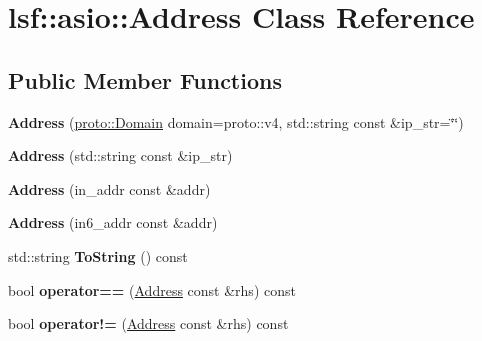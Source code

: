 \hypertarget{classlsf_1_1asio_1_1Address}{
\section{lsf::asio::Address Class Reference}
\label{classlsf_1_1asio_1_1Address}
}
\subsection*{Public Member Functions}
\begin{DoxyCompactItemize}
\item 
\hypertarget{classlsf_1_1asio_1_1Address_ad29b71a6abd25a94f80e0c92bf7bb107}{
{\bfseries Address} (\hyperlink{classlsf_1_1asio_1_1proto_1_1Domain}{proto::Domain} domain=proto::v4, std::string const \&ip\_\-str=\char`\"{}\char`\"{})}
\label{classlsf_1_1asio_1_1Address_ad29b71a6abd25a94f80e0c92bf7bb107}

\item 
\hypertarget{classlsf_1_1asio_1_1Address_a306d8c9367bd0de6c458e65adf67426e}{
{\bfseries Address} (std::string const \&ip\_\-str)}
\label{classlsf_1_1asio_1_1Address_a306d8c9367bd0de6c458e65adf67426e}

\item 
\hypertarget{classlsf_1_1asio_1_1Address_aacd98997aca18493decd1e876b1d12f5}{
{\bfseries Address} (in\_\-addr const \&addr)}
\label{classlsf_1_1asio_1_1Address_aacd98997aca18493decd1e876b1d12f5}

\item 
\hypertarget{classlsf_1_1asio_1_1Address_a57f0bd3e57ecfee53d33e6be5ad0d399}{
{\bfseries Address} (in6\_\-addr const \&addr)}
\label{classlsf_1_1asio_1_1Address_a57f0bd3e57ecfee53d33e6be5ad0d399}

\item 
\hypertarget{classlsf_1_1asio_1_1Address_aac38e5bc42dc2c180e390e7a49153d42}{
std::string {\bfseries ToString} () const }
\label{classlsf_1_1asio_1_1Address_aac38e5bc42dc2c180e390e7a49153d42}

\item 
\hypertarget{classlsf_1_1asio_1_1Address_a9c7b082df03606b08e811aa86c34bcde}{
bool {\bfseries operator==} (\hyperlink{classlsf_1_1asio_1_1Address}{Address} const \&rhs) const }
\label{classlsf_1_1asio_1_1Address_a9c7b082df03606b08e811aa86c34bcde}

\item 
\hypertarget{classlsf_1_1asio_1_1Address_ab03281729165efd0ef2ff846e0f4a32f}{
bool {\bfseries operator!=} (\hyperlink{classlsf_1_1asio_1_1Address}{Address} const \&rhs) const }
\label{classlsf_1_1asio_1_1Address_ab03281729165efd0ef2ff846e0f4a32f}


\end{DoxyCompactItemize}
